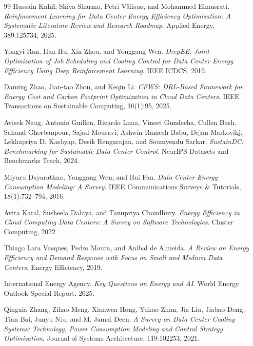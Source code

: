 ﻿\documentclass[12pt]{article}
\begin{document}
\begin{thebibliography}{99}
Hussain Kahil, Shiva Sharma, Petri V\"{a}lisuo, and Mohammed Elmusrati.
\newblock \emph{Reinforcement Learning for Data Center Energy Efficiency
Optimization: A Systematic Literature Review and Research Roadmap}.
\newblock Applied Energy, 389:125734, 2025.

Yongyi Ran, Han Hu, Xin Zhou, and Yonggang Wen.
\newblock \emph{DeepEE: Joint Optimization of Job Scheduling and Cooling
Control for Data Center Energy Efficiency Using Deep Reinforcement Learning}.
\newblock IEEE ICDCS, 2019.

Daming Zhao, Jian-tao Zhou, and Keqin Li.
\newblock \emph{CFWS: DRL-Based Framework for Energy Cost and Carbon Footprint
Optimization in Cloud Data Centers}.
\newblock IEEE Transactions on Sustainable Computing, 10(1):95, 2025.

Avisek Naug, Antonio Guillen, Ricardo Luna, Vineet Gundecha, Cullen Bash,
Sahand Ghorbanpour, Sajad Mousavi, Ashwin Ramesh Babu, Dejan Markovikj,
Lekhapriya D. Kashyap, Desik Rengarajan, and Soumyendu Sarkar.
\newblock \emph{SustainDC: Benchmarking for Sustainable Data Center Control}.
\newblock NeurIPS Datasets and Benchmarks Track, 2024.

Miyuru Dayarathna, Yonggang Wen, and Rui Fan.
\newblock \emph{Data Center Energy Consumption Modeling: A Survey}.
\newblock IEEE Communications Surveys \& Tutorials, 18(1):732--794, 2016.

Avita Katal, Susheela Dahiya, and Tanupriya Choudhury.
\newblock \emph{Energy Efficiency in Cloud Computing Data Centers: A Survey on
Software Technologies}.
\newblock Cluster Computing, 2022.

Thiago Lara Vasques, Pedro Moura, and An\'{i}bal de Almeida.
\newblock \emph{A Review on Energy Efficiency and Demand Response with Focus on
Small and Medium Data Centers}.
\newblock Energy Efficiency, 2019.

International Energy Agency.
\newblock \emph{Key Questions on Energy and AI}.
\newblock World Energy Outlook Special Report, 2025.

Qingxia Zhang, Zihao Meng, Xianwen Hong, Yuhao Zhan, Jia Liu, Jiabao Dong,
Tian Bai, Junyu Niu, and M. Jamal Deen.
\newblock \emph{A Survey on Data Center Cooling Systems: Technology, Power
Consumption Modeling and Control Strategy Optimization}.
\newblock Journal of Systems Architecture, 119:102253, 2021.


\end{thebibliography}
\end{document}
